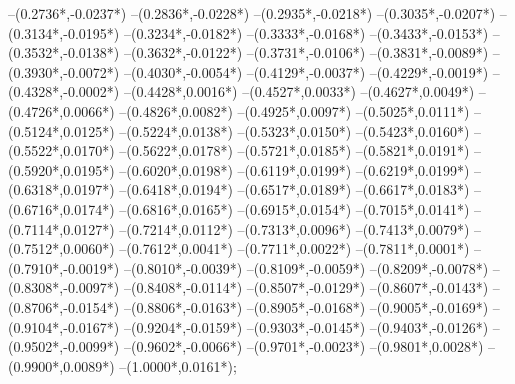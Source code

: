 {	--({0.2736*\xskala},{-0.0237*\yskala})
	--({0.2836*\xskala},{-0.0228*\yskala})
	--({0.2935*\xskala},{-0.0218*\yskala})
	--({0.3035*\xskala},{-0.0207*\yskala})
	--({0.3134*\xskala},{-0.0195*\yskala})
	--({0.3234*\xskala},{-0.0182*\yskala})
	--({0.3333*\xskala},{-0.0168*\yskala})
	--({0.3433*\xskala},{-0.0153*\yskala})
	--({0.3532*\xskala},{-0.0138*\yskala})
	--({0.3632*\xskala},{-0.0122*\yskala})
	--({0.3731*\xskala},{-0.0106*\yskala})
	--({0.3831*\xskala},{-0.0089*\yskala})
	--({0.3930*\xskala},{-0.0072*\yskala})
	--({0.4030*\xskala},{-0.0054*\yskala})
	--({0.4129*\xskala},{-0.0037*\yskala})
	--({0.4229*\xskala},{-0.0019*\yskala})
	--({0.4328*\xskala},{-0.0002*\yskala})
	--({0.4428*\xskala},{0.0016*\yskala})
	--({0.4527*\xskala},{0.0033*\yskala})
	--({0.4627*\xskala},{0.0049*\yskala})
	--({0.4726*\xskala},{0.0066*\yskala})
	--({0.4826*\xskala},{0.0082*\yskala})
	--({0.4925*\xskala},{0.0097*\yskala})
	--({0.5025*\xskala},{0.0111*\yskala})
	--({0.5124*\xskala},{0.0125*\yskala})
	--({0.5224*\xskala},{0.0138*\yskala})
	--({0.5323*\xskala},{0.0150*\yskala})
	--({0.5423*\xskala},{0.0160*\yskala})
	--({0.5522*\xskala},{0.0170*\yskala})
	--({0.5622*\xskala},{0.0178*\yskala})
	--({0.5721*\xskala},{0.0185*\yskala})
	--({0.5821*\xskala},{0.0191*\yskala})
	--({0.5920*\xskala},{0.0195*\yskala})
	--({0.6020*\xskala},{0.0198*\yskala})
	--({0.6119*\xskala},{0.0199*\yskala})
	--({0.6219*\xskala},{0.0199*\yskala})
	--({0.6318*\xskala},{0.0197*\yskala})
	--({0.6418*\xskala},{0.0194*\yskala})
	--({0.6517*\xskala},{0.0189*\yskala})
	--({0.6617*\xskala},{0.0183*\yskala})
	--({0.6716*\xskala},{0.0174*\yskala})
	--({0.6816*\xskala},{0.0165*\yskala})
	--({0.6915*\xskala},{0.0154*\yskala})
	--({0.7015*\xskala},{0.0141*\yskala})
	--({0.7114*\xskala},{0.0127*\yskala})
	--({0.7214*\xskala},{0.0112*\yskala})
	--({0.7313*\xskala},{0.0096*\yskala})
	--({0.7413*\xskala},{0.0079*\yskala})
	--({0.7512*\xskala},{0.0060*\yskala})
	--({0.7612*\xskala},{0.0041*\yskala})
	--({0.7711*\xskala},{0.0022*\yskala})
	--({0.7811*\xskala},{0.0001*\yskala})
	--({0.7910*\xskala},{-0.0019*\yskala})
	--({0.8010*\xskala},{-0.0039*\yskala})
	--({0.8109*\xskala},{-0.0059*\yskala})
	--({0.8209*\xskala},{-0.0078*\yskala})
	--({0.8308*\xskala},{-0.0097*\yskala})
	--({0.8408*\xskala},{-0.0114*\yskala})
	--({0.8507*\xskala},{-0.0129*\yskala})
	--({0.8607*\xskala},{-0.0143*\yskala})
	--({0.8706*\xskala},{-0.0154*\yskala})
	--({0.8806*\xskala},{-0.0163*\yskala})
	--({0.8905*\xskala},{-0.0168*\yskala})
	--({0.9005*\xskala},{-0.0169*\yskala})
	--({0.9104*\xskala},{-0.0167*\yskala})
	--({0.9204*\xskala},{-0.0159*\yskala})
	--({0.9303*\xskala},{-0.0145*\yskala})
	--({0.9403*\xskala},{-0.0126*\yskala})
	--({0.9502*\xskala},{-0.0099*\yskala})
	--({0.9602*\xskala},{-0.0066*\yskala})
	--({0.9701*\xskala},{-0.0023*\yskala})
	--({0.9801*\xskala},{0.0028*\yskala})
	--({0.9900*\xskala},{0.0089*\yskala})
	--({1.0000*\xskala},{0.0161*\yskala});
}

